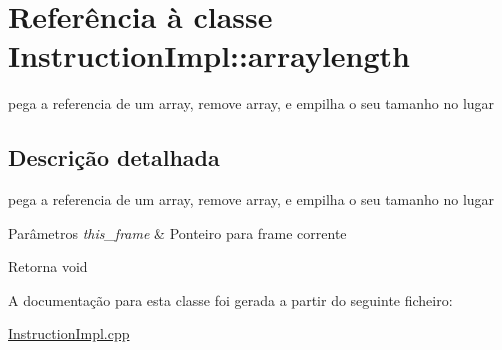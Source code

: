\hypertarget{class_instruction_impl_1_1arraylength}{}\section{Referência à classe Instruction\+Impl\+:\+:arraylength}
\label{class_instruction_impl_1_1arraylength}


pega a referencia de um array, remove array, e empilha o seu tamanho no lugar  




\subsection{Descrição detalhada}
pega a referencia de um array, remove array, e empilha o seu tamanho no lugar 


\begin{DoxyParams}{Parâmetros}
{\em this\+\_\+frame} & Ponteiro para frame corrente \\
\hline
\end{DoxyParams}
\begin{DoxyReturn}{Retorna}
void 
\end{DoxyReturn}


A documentação para esta classe foi gerada a partir do seguinte ficheiro\+:\begin{DoxyCompactItemize}
\item 
\hyperlink{_instruction_impl_8cpp}{Instruction\+Impl.\+cpp}\end{DoxyCompactItemize}
